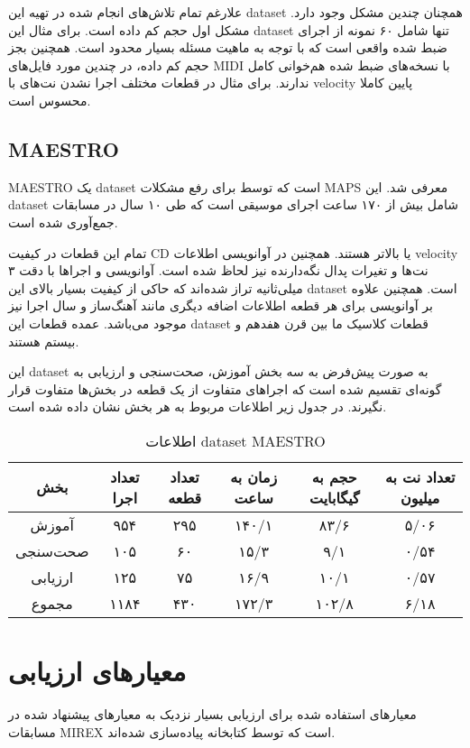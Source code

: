 علارغم تمام تلاش‌های انجام شده در تهیه این \gls{dataset} همچنان چندین مشکل وجود
دارد. مشکل اول حجم کم داده است. برای مثال این \gls{dataset} تنها شامل ۶۰ نمونه
از اجرای ضبط شده واقعی است که با توجه به ماهیت مسئله بسیار محدود است. همچنین بجز
حجم کم داده، در چندین مورد فایل‌های \gls{MIDI} با نسخه‌های ضبط شده هم‌خوانی کامل
ندارند. برای مثال در قطعات مختلف اجرا نشدن نت‌های با \gls{velocity} پایین کاملا
محسوس است.

\subsection{MAESTRO}
MAESTRO یک \gls{dataset} است که توسط \cite{hawthorne2018enabling} برای رفع
مشکلات MAPS معرفی شد. این \gls{dataset} شامل بیش از ۱۷۰ ساعت اجرای موسیقی است که
طی ۱۰ سال در مسابقات  جمع‌آوری شده است.

تمام این قطعات در کیفیت CD یا بالاتر هستند. همچنین در آوانویسی اطلاعات
\gls{velocity} نت‌ها و تغیرات پدال نگه‌دارنده نیز لحاظ شده است. آوانویسی و
اجراها با دقت ۳ میلی‌ثانیه تراز شده‌اند که حاکی از کیفیت بسیار بالای این
\gls{dataset} است. همچنین علاوه بر آوانویسی برای هر قطعه اطلاعات اضافه‌ دیگری
مانند آهنگ‌ساز و سال اجرا نیز موجود می‌باشد. عمده قطعات این \gls{dataset} قطعات
کلاسیک ما بین قرن هفدهم و بیستم هستند.

این \gls{dataset} به صورت پیش‌فرض به سه بخش آموزش، صحت‌سنجی و ارزیابی به گونه‌ای
تقسیم شده است که اجراهای متفاوت از یک قطعه در بخش‌ها متفاوت قرار نگیرند. در جدول
زیر اطلاعات مربوط به هر بخش نشان داده شده است.
\begin{table}[ht]
    \centering
    \begin{tabular}{|c|c|c|c|c|c|}
        \hline
        بخش & تعداد اجرا & تعداد قطعه & زمان به ساعت & حجم به گیگابایت & تعداد نت به میلیون \\
        \hline
        آموزش & ۹۵۴ & ۲۹۵ & ۱۴۰/۱ & ۸۳/۶ & ۵/۰۶ \\
        \hline
        صحت‌سنجی & ۱۰۵ & ۶۰ & ۱۵/۳ & ۹/۱ & ۰/۵۴ \\
        \hline
        ارزیابی & ۱۲۵ & ۷۵ & ۱۶/۹ & ۱۰/۱ & ۰/۵۷ \\
        \hline
        مجموع & ۱۱۸۴ & ۴۳۰ & ۱۷۲/۳ & ۱۰۲/۸ & ۶/۱۸ \\
        \hline
    \end{tabular}
    \caption{اطلاعات \gls{dataset} MAESTRO}
\end{table}

\section{معیارهای ارزیابی}
معیارهای استفاده شده برای ارزیابی بسیار نزدیک به معیارهای پیشنهاد شده در مسابقات
MIREX است که توسط کتابخانه  \cite{raffel2014mir_eval} پیاده‌سازی
شده‌اند.

